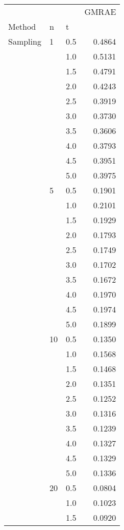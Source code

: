\begin{tabular}{lllr}
\toprule
          &     &     &  GMRAE \\
Method & n & t &        \\
\midrule
Sampling & 1   & 0.5 & 0.4864 \\
          &     & 1.0 & 0.5131 \\
          &     & 1.5 & 0.4791 \\
          &     & 2.0 & 0.4243 \\
          &     & 2.5 & 0.3919 \\
          &     & 3.0 & 0.3730 \\
          &     & 3.5 & 0.3606 \\
          &     & 4.0 & 0.3793 \\
          &     & 4.5 & 0.3951 \\
          &     & 5.0 & 0.3975 \\
          & 5   & 0.5 & 0.1901 \\
          &     & 1.0 & 0.2101 \\
          &     & 1.5 & 0.1929 \\
          &     & 2.0 & 0.1793 \\
          &     & 2.5 & 0.1749 \\
          &     & 3.0 & 0.1702 \\
          &     & 3.5 & 0.1672 \\
          &     & 4.0 & 0.1970 \\
          &     & 4.5 & 0.1974 \\
          &     & 5.0 & 0.1899 \\
          & 10  & 0.5 & 0.1350 \\
          &     & 1.0 & 0.1568 \\
          &     & 1.5 & 0.1468 \\
          &     & 2.0 & 0.1351 \\
          &     & 2.5 & 0.1252 \\
          &     & 3.0 & 0.1316 \\
          &     & 3.5 & 0.1239 \\
          &     & 4.0 & 0.1327 \\
          &     & 4.5 & 0.1329 \\
          &     & 5.0 & 0.1336 \\
          & 20  & 0.5 & 0.0804 \\
          &     & 1.0 & 0.1023 \\
          &     & 1.5 & 0.0920 \\

\end{tabular}
